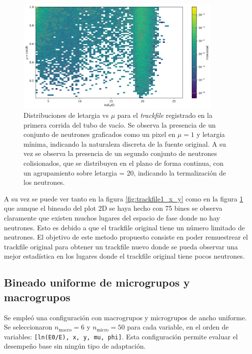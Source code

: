 \begin{figure}[H]
    \centering
    \includegraphics[width=0.9\textwidth]{figs/fig4_3.png}
    \caption{Distribuciones de letargia vs $\mu$ para el \emph{trackfile} registrado en la primera corrida del tubo de vacío. Se observa la presencia de un conjunto de neutrones graficados como un pixel en $\mu = 1$ y letargia mínima, indicando la naturaleza discreta de la fuente original. A su vez se observa la presencia de un segundo conjunto de neutrones colisionados, que se distribuyen en el plano de forma continua, con un agrupamiento sobre letargia = 20, indicando la termalización de los neutrones.}
    \label{fig:trackfile1_letargia_mu_2}
\end{figure}

A su vez se puede ver tanto en la figura \ref{fig:trackfile1_x_y} como en la figura \ref{fig:trackfile1_letargia_mu_2} que aunque el bineado del plot 2D se haya hecho con 75 bines se observa claramente que existen muchos lugares del espacio de fase donde no hay neutrones. Esto es debido a que el trackfile original tiene un número limitado de neutrones. El objetivo de este metodo propuesto consiste en poder remuestrear el trackfile original para obtener un trackfile nuevo donde se pueda observar una mejor estadística en los lugares donde el trackfile original tiene pocos neutrones. 

\subsection{Bineado uniforme de microgrupos y macrogrupos}  
Se empleó una configuración con macrogrupos y microgrupos de ancho uniforme. Se seleccionaron $n_{\text{macro}} = 6$ y $n_{\text{micro}} = 50$ para cada variable, en el orden de variables: \texttt{[ln(E0/E), x, y, mu, phi]}. Esta configuración permite evaluar el desempeño base sin ningún tipo de adaptación.

